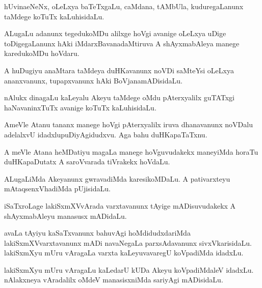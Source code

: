 \begin{mng}
hUvinaeNeNx, oLeLxya baTeTxgaLu, caMdana, tAMbUla, kuduregaLanunx taMdege koTuTx kaLuhisidaLu.
\end{mng}

\begin{mng}
ALugaLu adanunx tegedukoMDu alilxge hoVgi avanige oLeLxya uDige toDigegaLanunx hAki iMdarxBavanadaMtiruva A shAyxmabAleya manege karedukoMDu hoVdaru.
\end{mng}

\begin{mng}
A huDugiyu anaMtara taMdeya duHKavanunx noVDi saMteYsi oLeLxya ananxvanunx, tupapxvanunx hAki BoVjanamADisidaLu.
\end{mng}

\begin{mng}
nAlukx dinagaLu kaLeyalu Akeyu taMdege oMdu pAterxyalilx guTATxgi haNavaninxTuTx avanige koTuTx kaLuhisidaLu.
\end{mng}

\begin{mng}
AmeVle Atanu tananx manege hoVgi pAterxyalilx iruva dhanavanunx noVDalu adelalxvU idadxlupuDiyAgidudxvu. Aga bahu duHKapaTaTxnu.
\end{mng}

\begin{mng}
A meVle Atana heMDatiyu magaLa manege hoVguvudakekx maneyiMda horaTu duHKapaDutatx A saroVvarada tiVrakekx hoVdaLu.
\end{mng}

\begin{mng}
ALugaLiMda Akeyanunx gwravadiMda karesikoMDaLu. A pativarxteyu mAtaqsenxVhadiMda pUjisidaLu.
\end{mng}

\begin{mng}
iSaTxroLage lakiSxmXVvArada varxtavanunx tAyige mADisuvudakekx A shAyxmabAleyu manasusx mADidaLu.
\end{mng}

\begin{mng}
avaLa tAyiyu kaSaTxvanunx bahuvAgi hoMdidudxdariMda lakiSxmXVvarxtavanunx mADi navaNegaLa parxsAdavanunx sivxVkarisidaLu. lakiSxmXyu mUru vAragaLa varxta kaLeyuvavaregU koVpadiMda idadxLu.
\end{mng}

\begin{mng}
lakiSxmXyu mUru vAragaLu kaLedarU kUDa Akeyu koVpadiMdaleV idadxLu. nAlakxneya vAradalilx oMdeV manasisxniMda sariyAgi mADisidaLu.
\end{mng}

